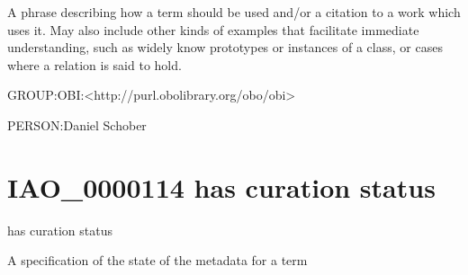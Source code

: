 \documentclass[letterpaper,10pt,english]{sphinxmanual}
\begin{document}
\begin{sphinxShadowBox}

\sphinxAtStartPar
A phrase describing how a term should be used and/or a citation to a work which uses it. May also include other kinds of examples that facilitate immediate understanding, such as widely know prototypes or instances of a class, or cases where a relation is said to hold.
\end{sphinxShadowBox}

\begin{sphinxShadowBox}

\sphinxAtStartPar
GROUP:OBI:\textless{}http://purl.obolibrary.org/obo/obi\textgreater{}
\end{sphinxShadowBox}

\begin{sphinxShadowBox}

\sphinxAtStartPar
PERSON:Daniel Schober
\end{sphinxShadowBox}
\begin{quote}
\label{\detokenize{doc-IAO_0000114:iao-0000114}}\label{\detokenize{doc-IAO_0000114:has-curation-status}}\label{\detokenize{doc-IAO_0000114:iao-0000114}}
\ignorespaces \end{quote}


\section{IAO\_0000114 \sphinxhyphen{} has curation status}
\label{\detokenize{doc-IAO_0000114:iao-0000114-has-curation-status}}\label{\detokenize{doc-IAO_0000114:index-0}}\label{\detokenize{doc-IAO_0000114::doc}}
\begin{sphinxShadowBox}

\sphinxAtStartPar
has curation status
\end{sphinxShadowBox}

\begin{sphinxShadowBox}

\sphinxAtStartPar
A specification of the state of the metadata for a term
\end{sphinxShadowBox}
\end{document}
